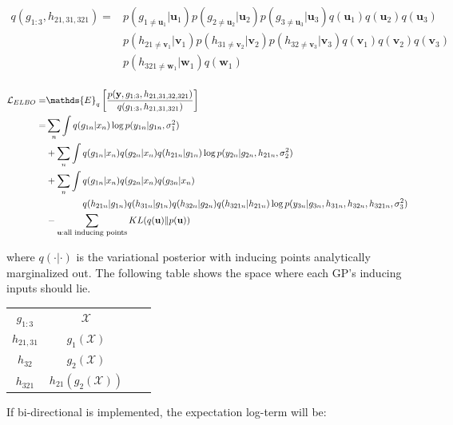\documentclass{article}
\begin{document}
\begin{align*}
	q(g_{1:3}, h_{21, 31, 321}) = & p(g_{1\neq\mathbf{u}_1}|\mathbf{u}_1)p(g_{2\neq\mathbf{u}_2}|\mathbf{u}_2)p(g_{3\neq\mathbf{u}_3}|\mathbf{u}_3)q(\mathbf{u}_1)q(\mathbf{u}_2)q(\mathbf{u}_3)\\
	& p(h_{21\neq\mathbf{v}_1}|\mathbf{v}_1)p(h_{31\neq\mathbf{v}_2}|\mathbf{v}_2)p(h_{32\neq\mathbf{v}_3}|\mathbf{v}_3)q(\mathbf{v}_1)q(\mathbf{v}_2)q(\mathbf{v}_3)\\	
	& p(h_{321\neq\mathbf{w}_1}|\mathbf{w}_1)q(\mathbf{w}_1)\\
\end{align*}

\begin{align*}
	\mathcal{L}_{ELBO} = & \mathds{E}_q\left[ \frac{p(\mathbf{y},g_{1:3}, h_{21,31,32,321})}{q(g_{1:3}, h_{21, 31, 321})}\right]\\
	=  & \sum_n \int q(g_{1n}|x_n) \log p(y_{1n}|g_{1n}, \sigma^2_1) \\
	& + \sum_n \int q(g_{1n}|x_n) q(g_{2n}|x_n) q(h_{21n}|g_{1n}) \log p(y_{2n}|g_{2n},h_{21n},\sigma^2_2) \\
	& + \sum_n \int q(g_{1n}|x_n)  q(g_{2n}|x_n) q(g_{3n}|x_n)\\
	& \hspace{4em} q(h_{21n}|g_{1n}) q(h_{31n}|g_{1n}) q(h_{32n}|g_{2n}) q(h_{321n}|h_{21n}) \log p(y_{3n}| g_{3n}, h_{31n}, h_{32n}, h_{321n}, \sigma^2_3)\\
	& -\sum_{\mathbf{u}: \text{\footnotesize all inducing points}} KL(q(\mathbf{u})\|p(\mathbf{u}))
\end{align*}

where $q(\cdot|\cdot)$ is the variational posterior with inducing points analytically marginalized out. The following table shows the space where each GP's inducing inputs should lie.

\begin{table}[H]
\centering
\begin{tabular}{|c|c|c|c|}
\hline
$g_{1:3}$ & $\mathcal{X}$\\
$h_{21,31}$ & $g_1(\mathcal{X})$\\
$h_{32}$ & $g_2(\mathcal{X})$\\
$h_{321}$ & $h_{21}(g_2(\mathcal{X}))$\\
\hline
\end{tabular}
\end{table}

If bi-directional is implemented, the expectation log-term will be:
\end{document}
